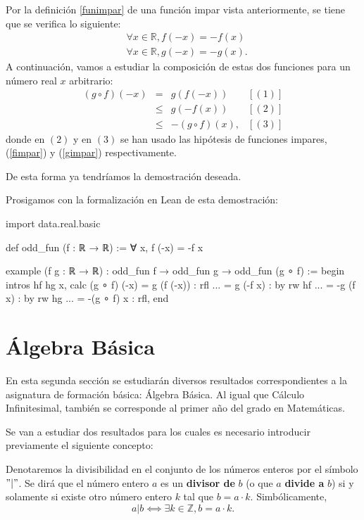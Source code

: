 \begin{demostracion}
  Por la definición \ref{funimpar} de una función impar vista
  anteriormente, se tiene que se verifica lo siguiente:
  \begin{align}
    & ∀ x ∈ ℝ, f(-x) = -f(x)  \label{fimpar} \\
    & ∀ x ∈ ℝ, g(-x) = -g(x). \label{gimpar}
  \end{align}
  A continuación, vamos a estudiar la composición de estas dos funciones
  para un número real \(x\) arbitrario:
  \[\begin{array}{llll}
      (g ∘ f)(-x) &= &g(f(-x))     & [(1)]\\
                  &≤ &g(-f(x))     & [(2)] \\
                  &≤ &-(g ∘ f)(x), & [(3)]
    \end{array}\]
  donde en \((2)\) y en \((3)\) se han usado las hipótesis de funciones
  impares, (\ref{fimpar}) y (\ref{gimpar}) respectivamente.

  De esta forma ya tendríamos la demostración deseada.
\end{demostracion}

Prosigamos con la formalización en Lean de esta demostración:
\begin{leancode}
import data.real.basic

def odd_fun (f : ℝ → ℝ) := ∀ x, f (-x) = -f x

example
  (f g : ℝ → ℝ)
  : odd_fun f → odd_fun g →  odd_fun (g ∘ f) :=
begin
  intros hf hg x,
  calc (g ∘ f) (-x)
      =  g (f (-x)) : rfl
  ... =  g (-f x)   : by rw hf
  ... = -g (f x)    : by rw hg
  ... =  -(g ∘ f) x : rfl,
end
\end{leancode}

\section{Álgebra Básica}

En esta segunda sección se estudiarán diversos resultados
correspondientes a la asignatura de formación básica: Álgebra Básica.
Al igual que Cálculo Infinitesimal, también se corresponde al primer año
del grado en Matemáticas.

Se van a estudiar dos resultados para los cuales es necesario introducir
previamente el siguiente concepto:
\begin{definicion}\label{division}
  Denotaremos la divisibilidad en el conjunto de los números enteros por
  el símbolo \("|"\). Se dirá que el número entero \(a\) es un
  \textbf{divisor de} \(b\) (o que \(a\) \textbf{divide a} \(b\)) si y
  solamente si existe otro número entero \(k\) tal que \(b = a · k\).
  Simbólicamente,
  \begin{equation}
    a|b ⟺ ∃ k ∈ ℤ, b = a · k.
  \end{equation}
\end{definicion}

